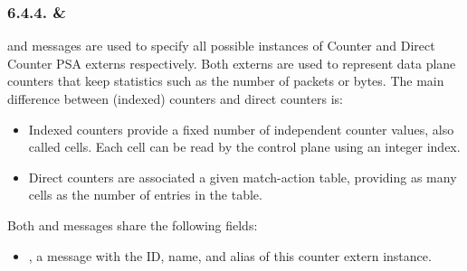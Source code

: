 \documentclass[11pt]{article}
\begin{document}
{%
\subsubsection{6.4.4.\hspace*{0.5em} \& }\label{sec-counter-directcounter}%

\noindent{} and  messages are used to specify all possible
instances of Counter and Direct Counter PSA externs respectively. Both externs
are used to represent data plane counters that keep statistics such as the
number of packets or bytes. The main difference between (indexed) counters and
direct counters is:%

\begin{itemize}%

\item{}
Indexed counters provide a fixed number of independent counter values, also
called cells. Each cell can be read by the control plane using an integer
index.%

\item{}
Direct counters are associated a given match-action table, providing as many
cells as the number of entries in the table.%
\end{itemize}%

\noindent{}Both  and  messages share the following fields:%

\begin{itemize}%

\item{}
, a  message with the ID, name, and alias of this counter
extern instance.%


\end{itemize}}
\end{document}
